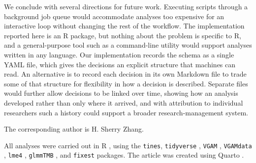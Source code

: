 \documentclass[aoas]{imsart}
\begin{document}
We conclude with several directions for future work. Executing scripts
through a background job queue would accommodate analyses too expensive
for an interactive loop without changing the rest of the workflow. The
implementation reported here is an R package, but nothing about the
problem is specific to R, and a general-purpose tool such as a
command-line utility would support analyses written in any language. Our
implementation records the schema as a single YAML file, which gives the
decisions an explicit structure that machines can read. An alternative
is to record each decision in its own Markdown file to trade some of
that structure for flexibility in how a decision is described. Separate
files would further allow decisions to be linked over time, showing how
an analysis developed rather than only where it arrived, and with
attribution to individual researchers such a history could support a
broader research-management system.

\begin{acks}[Acknowledgments]
The corresponding author is H. Sherry Zhang.

All analyses were carried out in R \citep{R}, using the \texttt{tines},
\texttt{tidyverse} \citep{wickham2019tidyverse}, \texttt{VGAM}
\citep{VGAM}, \texttt{VGAMdata} \citep{VGAMdata}, \texttt{lme4}
\citep{lme4}, \texttt{glmmTMB} \citep{glmmTMB-1, glmmTMB-2}, and
\texttt{fixest} \citep{fixest} packages. The article was created using
Quarto \citep{Allaire_Quarto_2026}.

\end{acks}

\begin{supplement}
\end{supplement}

\begin{supplement}
\end{supplement}



\end{document}
